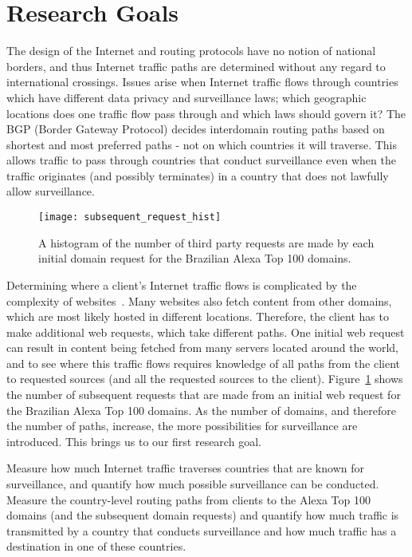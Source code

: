 \section{Research Goals}
\label{problem}

The design of the Internet and routing protocols have no notion of national borders, and thus Internet traffic paths are determined without any regard to international crossings.  Issues arise when Internet traffic flows through countries which have different data privacy and surveillance laws; which geographic locations does one traffic flow pass through and which laws should govern it?  The BGP (Border Gateway Protocol) decides interdomain routing paths based on shortest and most preferred paths - not on which countries it will traverse.  This allows traffic to pass through countries that conduct surveillance even when the traffic originates (and possibly terminates) in a country that does not lawfully allow surveillance.  

\begin{figure}[t]
\centering
\texttt{[image: subsequent\_request\_hist]}
\caption{A histogram of the number of third party requests are made by each initial domain request for the Brazilian Alexa Top 100 domains.}
\label{fig:domains}
\end{figure}

Determining where a client's Internet traffic flows is complicated by the complexity of websites~\cite{butkiewicz2011understanding}.  Many websites also fetch content from other domains, which are most likely hosted in different locations.  Therefore, the client has to make additional web requests, which take different paths.  One initial web request can result in content being fetched from many servers located around the world, and to see where this traffic flows requires knowledge of all paths from the client to requested sources (and all the requested sources to the client).  Figure~\ref{fig:domains} shows the number of subsequent requests that are made from an initial web request for the Brazilian Alexa Top 100 domains.  As the number of domains, and therefore the number of paths, increase, the more possibilities for surveillance are introduced.  This brings us to our first research goal.

\begin{thm}
Measure how much Internet traffic traverses countries that are known for surveillance, and quantify how much possible surveillance can be conducted.  Measure the country-level routing paths from clients to the Alexa Top 100 domains (and the subsequent domain requests) and quantify how much traffic is transmitted by a country that conducts surveillance and how much traffic has a destination in one of these countries.
\end{thm}

